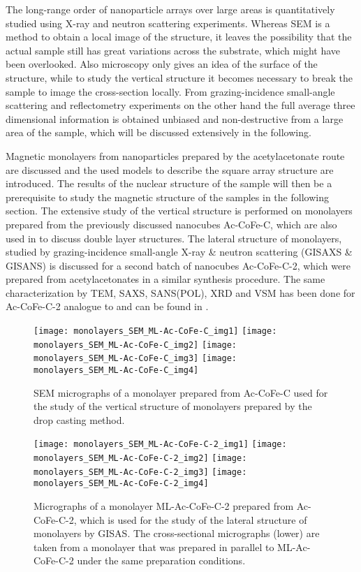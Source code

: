 \documentclass[\main/dresen_thesis.tex]{subfiles}
\begin{document}
  The long-range order of nanoparticle arrays over large areas is quantitatively studied using X-ray and neutron scattering experiments.
  Whereas SEM is a method to obtain a local image of the structure, it leaves the possibility that the actual sample still has great variations across the substrate, which might have been overlooked.
  Also microscopy only gives an idea of the surface of the structure, while to study the vertical structure it becomes necessary to break the sample to image the cross-section locally.
  From grazing-incidence small-angle scattering and reflectometry experiments on the other hand the full average three dimensional information is obtained unbiased and non-destructive from a large area of the sample, which will be discussed extensively in the following.

  Magnetic monolayers from nanoparticles prepared by the acetylacetonate route are discussed and the used models to describe the square array structure are introduced.
  The results of the nuclear structure of the sample will then be a prerequisite to study the magnetic structure of the samples in the following section.
  The extensive study of the vertical structure is performed on monolayers prepared from the previously discussed nanocubes Ac-CoFe-C, which are also used in  to discuss double layer structures.
  The lateral structure of monolayers, studied by grazing-incidence small-angle X-ray \& neutron scattering (GISAXS \& GISANS) is discussed for a second batch of nanocubes Ac-CoFe-C-2, which were prepared from acetylacetonates in a similar synthesis procedure.
  The same characterization by TEM, SAXS, SANS(POL), XRD and VSM has been done for Ac-CoFe-C-2 analogue to  and can be found in .

  \begin{figure}[tb]
    \centering
    \texttt{[image: monolayers\_SEM\_ML-Ac-CoFe-C\_img1]}
    \texttt{[image: monolayers\_SEM\_ML-Ac-CoFe-C\_img2]}
    \texttt{[image: monolayers\_SEM\_ML-Ac-CoFe-C\_img3]}
    \texttt{[image: monolayers\_SEM\_ML-Ac-CoFe-C\_img4]}
    \caption{\label{fig:monolayers:structure:semImagesMLACCoFeC}SEM micrographs of a monolayer prepared from Ac-CoFe-C used for the study of the vertical structure of monolayers prepared by the drop casting method.}
  \end{figure}

  \begin{figure}[tb]
    \centering
    \texttt{[image: monolayers\_SEM\_ML-Ac-CoFe-C-2\_img1]}
    \texttt{[image: monolayers\_SEM\_ML-Ac-CoFe-C-2\_img2]}
    \texttt{[image: monolayers\_SEM\_ML-Ac-CoFe-C-2\_img3]}
    \texttt{[image: monolayers\_SEM\_ML-Ac-CoFe-C-2\_img4]}
    \caption{\label{fig:monolayers:structure:semImagesMLACCoFeC2}Micrographs of a monolayer ML-Ac-CoFe-C-2 prepared from Ac-CoFe-C-2, which is used for the study of the lateral structure of monolayers by GISAS. The cross-sectional micrographs (lower) are taken from a monolayer that was prepared in parallel to ML-Ac-CoFe-C-2 under the same preparation conditions.}
  \end{figure}
\end{document}

